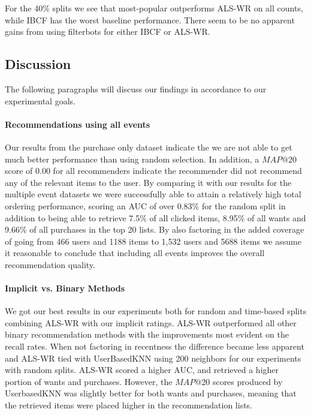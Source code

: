 For the 40\% splits we see that most-popular outperforms ALS-WR on all counts, while IBCF has the worst baseline performance. There seem to be no apparent gains
from using filterbots for either IBCF or ALS-WR.

\subsection{Discussion}

The following paragraphs will discuss our findings in accordance to our experimental goals.

\paragraph{Recommendations using all events}

Our results from the purchase only dataset indicate the we are not able to get much better performance than using random selection.
In addition, a $MAP@20$ score of 0.00 for all recommenders indicate the recommender did not recommend any of the relevant items
to the user. By comparing it with our results for the multiple event datasets we were successfully able to attain a relatively high total
ordering performance, scoring an AUC of over 0.83\% for the random split in addition to being able to retrieve
7.5\% of all clicked items, 8.95\% of all wants and 9.66\% of all purchases in the top 20 lists. By also factoring in the added
coverage of going from 466 users and 1188 items to 1,532 users and 5688 items we assume it reasonable to conclude that including
all events improves the overall recommendation quality.

\paragraph{Implicit vs. Binary Methods}

We got our best results in our experiments both for random and time-based splits combining ALS-WR with our implicit ratings.
ALS-WR outperformed all other binary recommendation methods with the improvements most evident on the recall
rates. When not factoring in recentness the difference became less apparent and ALS-WR tied with UserBasedKNN using
200 neighbors for our experiments with random splits. ALS-WR scored a higher AUC, and retrieved a higher portion of wants
and purchases. However, the $MAP@20$ scores produced by UserbasedKNN was slightly better for both wants and purchases,
meaning that the retrieved items were placed higher in the recommendation lists.


